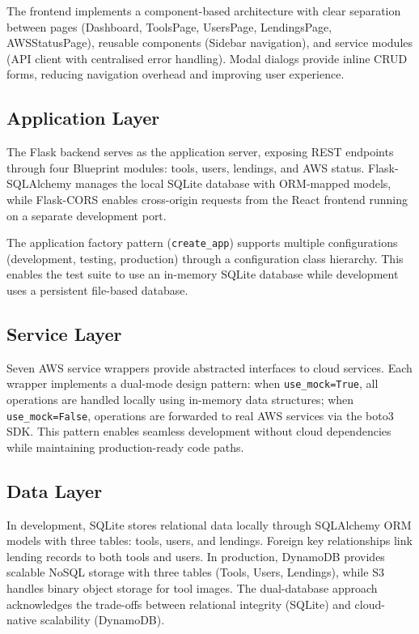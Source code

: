 \documentclass[conference]{IEEEtran}
\begin{document}
The frontend implements a component-based architecture with clear separation between pages (Dashboard, ToolsPage, UsersPage, LendingsPage, AWSStatusPage), reusable components (Sidebar navigation), and service modules (API client with centralised error handling). Modal dialogs provide inline CRUD forms, reducing navigation overhead and improving user experience.

\subsection{Application Layer}
The Flask backend serves as the application server, exposing REST endpoints through four Blueprint modules: tools, users, lendings, and AWS status. Flask-SQLAlchemy manages the local SQLite database with ORM-mapped models, while Flask-CORS enables cross-origin requests from the React frontend running on a separate development port.

The application factory pattern (\texttt{create\_app}) supports multiple configurations (development, testing, production) through a configuration class hierarchy. This enables the test suite to use an in-memory SQLite database while development uses a persistent file-based database.

\subsection{Service Layer}
Seven AWS service wrappers provide abstracted interfaces to cloud services. Each wrapper implements a dual-mode design pattern: when \texttt{use\_mock=True}, all operations are handled locally using in-memory data structures; when \texttt{use\_mock=False}, operations are forwarded to real AWS services via the boto3 SDK. This pattern enables seamless development without cloud dependencies while maintaining production-ready code paths.

\subsection{Data Layer}
In development, SQLite stores relational data locally through SQLAlchemy ORM models with three tables: tools, users, and lendings. Foreign key relationships link lending records to both tools and users. In production, DynamoDB provides scalable NoSQL storage with three tables (Tools, Users, Lendings), while S3 handles binary object storage for tool images. The dual-database approach acknowledges the trade-offs between relational integrity (SQLite) and cloud-native scalability (DynamoDB).
\end{document}
